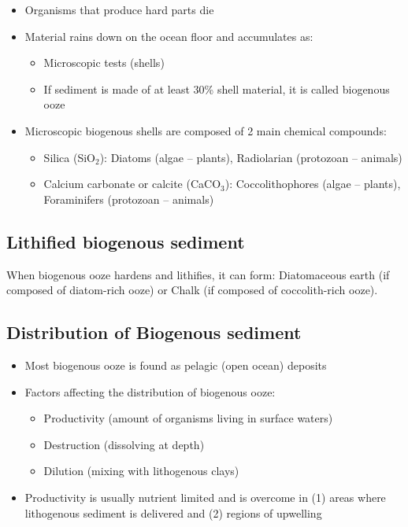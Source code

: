 \begin{itemize}
    \item Organisms that produce hard parts die
    \item Material rains down on the ocean floor and accumulates as:
        \begin{itemize}
            \item Microscopic tests (shells)
            \item If sediment is made of at least 30\% shell material, it is
                called biogenous ooze
        \end{itemize}
    \item Microscopic biogenous shells are composed of 2 main chemical
        compounds:
        \begin{itemize}
            \item Silica (SiO$_2$): Diatoms (algae -- plants), Radiolarian
                (protozoan -- animals)
            \item Calcium carbonate or calcite (CaCO$_3$):
                Coccolithophores (algae -- plants), Foraminifers
                (protozoan -- animals)
        \end{itemize}
\end{itemize}

\subsection{Lithified biogenous sediment}

When biogenous ooze hardens and lithifies, it can form:
Diatomaceous earth (if composed of diatom-rich ooze) or Chalk (if composed of
coccolith-rich ooze).

\subsection{Distribution of Biogenous sediment}

\begin{itemize}
    \item Most biogenous ooze is found as pelagic (open ocean) deposits
    \item Factors affecting the distribution of biogenous ooze:
        \begin{itemize}
            \item Productivity (amount of organisms living in surface waters)
            \item Destruction (dissolving at depth)
            \item Dilution (mixing with lithogenous clays)
        \end{itemize}
    \item Productivity is usually nutrient limited and is overcome in
        (1) areas where lithogenous sediment is delivered and (2) regions of
        upwelling
\end{itemize}

